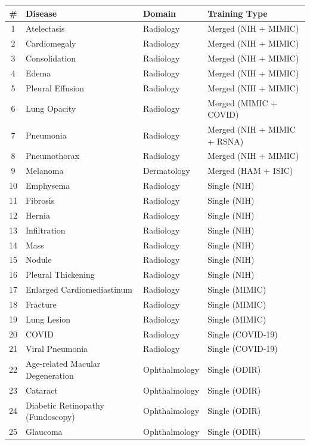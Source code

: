 \documentclass[12pt,a4paper]{report}
\begin{document}
\begingroup\footnotesize
\setlength{\tabcolsep}{4pt}
\setlength{\LTleft}{0pt plus 1fill}
\setlength{\LTright}{0pt plus 1fill}
\begin{longtable}{@{}clll@{}}
\toprule
\textbf{\#} & \textbf{Disease} & \textbf{Domain} & \textbf{Training Type} \\
\midrule
\endhead
1 & Atelectasis & Radiology & Merged (NIH + MIMIC) \\
2 & Cardiomegaly & Radiology & Merged (NIH + MIMIC) \\
3 & Consolidation & Radiology & Merged (NIH + MIMIC) \\
4 & Edema & Radiology & Merged (NIH + MIMIC) \\
5 & Pleural Effusion & Radiology & Merged (NIH + MIMIC) \\
6 & Lung Opacity & Radiology & Merged (MIMIC + COVID) \\
7 & Pneumonia & Radiology & Merged (NIH + MIMIC + RSNA) \\
8 & Pneumothorax & Radiology & Merged (NIH + MIMIC) \\
9 & Melanoma & Dermatology & Merged (HAM + ISIC) \\
10 & Emphysema & Radiology & Single (NIH) \\
11 & Fibrosis & Radiology & Single (NIH) \\
12 & Hernia & Radiology & Single (NIH) \\
13 & Infiltration & Radiology & Single (NIH) \\
14 & Mass & Radiology & Single (NIH) \\
15 & Nodule & Radiology & Single (NIH) \\
16 & Pleural Thickening & Radiology & Single (NIH) \\
17 & Enlarged Cardiomediastinum & Radiology & Single (MIMIC) \\
18 & Fracture & Radiology & Single (MIMIC) \\
19 & Lung Lesion & Radiology & Single (MIMIC) \\
20 & COVID & Radiology & Single (COVID-19) \\
21 & Viral Pneumonia & Radiology & Single (COVID-19) \\
22 & Age-related Macular Degeneration & Ophthalmology & Single (ODIR) \\
23 & Cataract & Ophthalmology & Single (ODIR) \\
24 & Diabetic Retinopathy (Fundoscopy) & Ophthalmology & Single (ODIR) \\
25 & Glaucoma & Ophthalmology & Single (ODIR) \\

\end{longtable}
\end{document}
